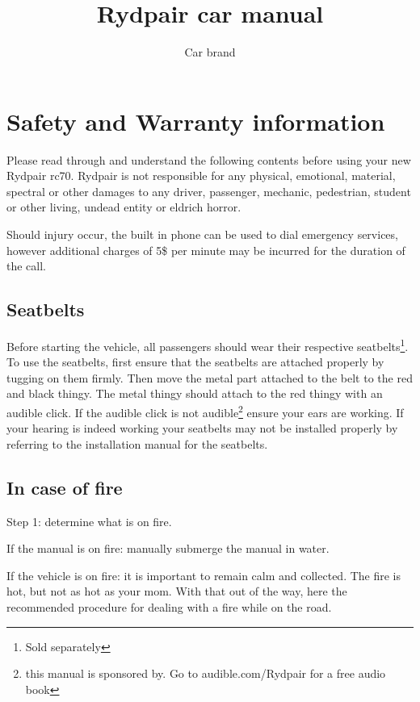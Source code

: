 \documentclass{article}
\title{Rydpair car manual}
\author{Car brand}
\newcommand{\carbrand}{Rydpair}
\newcommand{\carmodel}{rc70}
\newcommand{\emergencyPhoneCost}{5\$}
\begin{document}
    \maketitle

    \section{Safety and Warranty information}
    Please read through and understand the following contents before using your
    new \carbrand{\textregistered} \carmodel{\texttrademark}.
    \carbrand{\textregistered} is not responsible for any physical, emotional,
    material, spectral or other damages to any driver, passenger, mechanic,
    pedestrian, student or other living, undead entity or eldrich horror.

    Should injury occur, the built in phone can be used to dial emergency
    services, however additional charges of \emergencyPhoneCost{} per minute
    may be incurred for the duration of the call.

    \subsection{Seatbelts}

    Before starting the vehicle, all passengers should wear their respective
    seatbelts\footnote{Sold separately}. To use the seatbelts, first ensure
    that the seatbelts are attached properly by tugging on them firmly. Then
    move the metal part attached to the belt to the red and black thingy. The
    metal thingy should attach to the red thingy with an audible click. If the
    audible click is not audible\footnote{this manual is sponsored by. Go to
    audible.com/\carbrand{} for a free audio book} ensure your ears are
    working. If your hearing is indeed working your seatbelts may not be
    installed properly by referring to the installation manual for the
    seatbelts.


    \subsection{In case of fire}

    Step 1: determine what is on fire.

    If the manual is on fire: manually submerge the manual in water.

    If the vehicle is on fire: it is important to remain calm and collected.
    The fire is hot, but not as hot as your mom. With that out of the way, here
    the recommended procedure for dealing with a fire while on the road.
\end{document}
